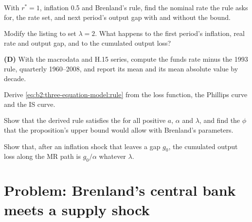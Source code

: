 \begin{exercise}[$\star\star$]\label{exo:b2:three-equation-model:7}
With $r^* = 1$, inflation 0.5 and Brenland's rule, find the nominal rate the rule asks for, the rate set, and next period's output gap with
and without the bound.
\end{exercise}

\begin{exercise}[$\star\star$]\label{exo:b2:three-equation-model:8}
Modify the listing to set $\lambda = 2$. What happens to the first period's inflation, real rate and output gap, and to the cumulated output loss?
\end{exercise}

\begin{exercise}[$\star\star$]\label{exo:b2:three-equation-model:9}
\textbf{(D)} With the macrodata and H.15 series, compute the funds rate minus the 1993 rule, quarterly 1960--2008, and report
its mean and its mean absolute value by decade.
\end{exercise}

\begin{exercise}[$\star\star\star$]\label{exo:b2:three-equation-model:10}
Derive \eqref{eq:b2:three-equation-model:rule} from the loss function, the Phillips curve and the IS curve.
\end{exercise}

\begin{exercise}[$\star\star\star$]\label{exo:b2:three-equation-model:11}
Show that the derived rule satisfies the  for all positive $a$, $\alpha$ and $\lambda$, and find the $\phi$ that the proposition's upper bound would allow with
Brenland's parameters.
\end{exercise}

\begin{exercise}[$\star\star\star$]\label{exo:b2:three-equation-model:12}
Show that, after an inflation shock that leaves a gap $g_0$, the cumulated output loss along the MR path is $g_0/\alpha$ whatever $\lambda$.
\end{exercise}

\section{Problem: Brenland's central bank meets a supply shock}\label{sec:b2:three-equation-model:problem}

